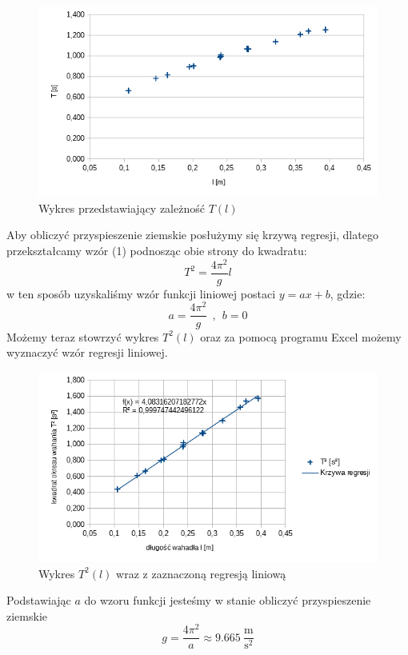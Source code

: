 \documentclass[a4paper,12pts]{article}
\begin{document}
	\begin{figure}[h!]
		\centering
		\includegraphics[scale=0.8]{T(l)}
		\caption{Wykres przedstawiający zależność $T(l)$}
		\label{wykr1}
	\end{figure}
	Aby obliczyć przyspieszenie ziemskie posłużymy się krzywą regresji, dlatego przekształcamy wzór (1)	podnosząc obie strony do kwadratu:
	\begin{equation}
		T^2 = \frac{4 \pi^2}{g} l
	\end{equation}
	w ten sposób uzyskaliśmy wzór funkcji liniowej postaci $y = ax + b$, gdzie:
	\begin{equation}
		a = \frac{4 \pi^2}{g}~~,~~b = 0
	\end{equation}
	Możemy teraz stowrzyć wykres $T^2(l)$ oraz za pomocą programu Excel możemy wyznaczyć wzór regresji liniowej.
	\begin{figure}[!h]
		\centering
		\includegraphics[scale=0.7]{regresja.png}
		\caption{Wykres $T^2(l)$ wraz z zaznaczoną regresją liniową}
	\end{figure}


	Podstawiając $a$ do wzoru funkcji jesteśmy w stanie obliczyć przyspieszenie ziemskie
	\begin{equation}
		g = \frac{4 \pi ^ 2}{a} \approx 9.665 ~\frac{\textrm{m}}{\textrm{s}^2}  
	\end{equation}
	
\end{document}
